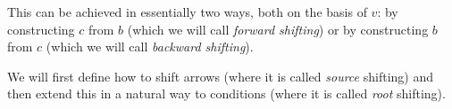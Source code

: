 This can be achieved in essentially two ways, both on the basis of $v$: by constructing $c$ from $b$ (which we will call \emph{forward shifting}) or by constructing $b$ from $c$ (which we will call \emph{backward shifting}). 



We will first define how to shift arrows (where it is called \emph{source} shifting) and then extend this in a natural way to conditions (where it is called \emph{root} shifting).

